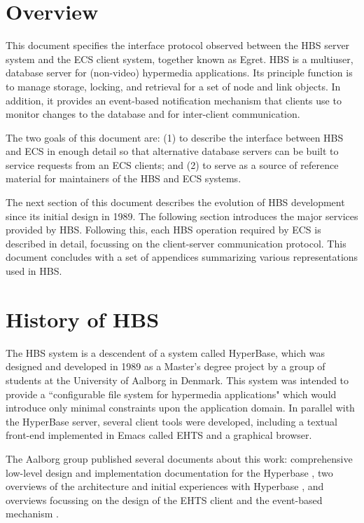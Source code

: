 \newpage 
\section{Overview}
\label{sec:motivation}

This document specifies the interface protocol observed between the HBS
server system and the ECS client system, together known as Egret.  HBS is a
multiuser, database server for (non-video) hypermedia applications.  Its
principle function is to manage storage, locking, and retrieval for a set
of node and link objects.  In addition, it provides an event-based
notification mechanism that clients use to monitor changes to the database
and for inter-client communication.

The two goals of this document are: (1) to describe the interface between
HBS and ECS in enough detail so that alternative database servers can be
built to service requests from an ECS clients; and (2) to serve as a source
of reference material for maintainers of the HBS and ECS systems.

The next section of this document describes the evolution of HBS development
since its initial design in 1989.  The following section introduces the major
services provided by HBS.  Following this, each HBS operation required by 
ECS is described in detail, focussing on the client-server communication protocol.
This document concludes with a set of appendices summarizing various representations
used in HBS.


\section{History of HBS}

The HBS system is a descendent of a system called HyperBase, which was
designed and developed in 1989 as a Master's degree project by a group of students at
the University of Aalborg in Denmark.  This system was intended to provide
a ``configurable file system for hypermedia applications" which would
introduce only minimal constraints upon the application domain.  In
parallel with the HyperBase server, several client tools were developed,
including a textual front-end implemented in Emacs called EHTS and a
graphical browser.

The Aalborg group published several documents about this work: comprehensive
low-level design and implementation documentation for the Hyperbase
\cite{Wiil90a}, two overviews of the architecture and initial experiences with
Hyperbase \cite{Wiil90b,Wiil90c}, and overviews focussing on the design of the
EHTS client \cite {Wiil91b} and the event-based mechanism \cite{Wiil91}.

